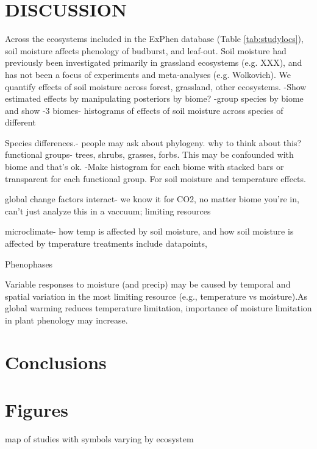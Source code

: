 \documentclass{article}
\begin{document}
\section* {DISCUSSION}
\par  Across the ecosystems included in the ExPhen database (Table \ref{tab:studylocs}), soil moisture affects phenology of budburst, and  leaf-out. Soil moisture had previously been investigated primarily in grassland ecosystems (e.g. XXX), and has not been a focus of experiments and meta-analyses (e.g. Wolkovich). We quantify effects of soil moisture across forest, grassland, other ecosystems.
-Show estimated effects by manipulating posteriors by biome?
-group species by biome and show 
-3 biomes- histograms of effects of soil moisture across species of different 

\par Species differences.- people may ask about phylogeny. why to think about this? functional groups- trees, shrubs, grasses, forbs. This may be confounded with biome and that's ok.
 -Make histogram for each biome with stacked bars or transparent for each functional group. For soil moisture and temperature effects.
 \par global change factors interact- we know it for CO2, no matter biome you're in, can't just analyze this in a vaccuum; limiting resources
\par microclimate- how temp is affected by soil moisture, and how soil moisture is affected by tmperature treatments
include datapoints, 
\par Phenophases
\par 
\par Variable responses to moisture (and precip) may be caused by temporal and spatial variation in the most limiting resource (e.g., temperature vs moisture).As global warming reduces temperature limitation, importance of moisture limitation in plant phenology may increase. 

\section* {Conclusions}




\section*{Figures}
\par map of studies with symbols varying by ecosystem
\end{document}
